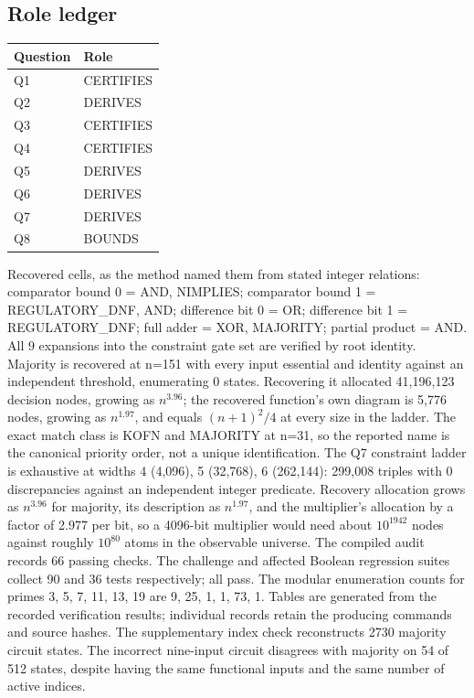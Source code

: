 \subsection*{Role ledger}
\begin{center}\begin{tabular}{ll}\toprule Question & Role\\\midrule
Q1 & CERTIFIES\\
Q2 & DERIVES\\
Q3 & CERTIFIES\\
Q4 & CERTIFIES\\
Q5 & DERIVES\\
Q6 & DERIVES\\
Q7 & DERIVES\\
Q8 & BOUNDS\\
\bottomrule\end{tabular}\end{center}
Recovered cells, as the method named them from stated integer relations: comparator bound 0 = AND, NIMPLIES; comparator bound 1 = REGULATORY\_DNF, AND; difference bit 0 = OR; difference bit 1 = REGULATORY\_DNF; full adder = XOR, MAJORITY; partial product = AND. All 9 expansions into the constraint gate set are verified by root identity.
Majority is recovered at n=151 with every input essential and identity against an independent threshold, enumerating 0 states. Recovering it allocated 41,196,123 decision nodes, growing as $n^{3.96}$; the recovered function's own diagram is 5,776 nodes, growing as $n^{1.97}$, and equals $(n+1)^2/4$ at every size in the ladder. The exact match class is KOFN and MAJORITY at n=31, so the reported name is the canonical priority order, not a unique identification.
The Q7 constraint ladder is exhaustive at widths 4 (4,096), 5 (32,768), 6 (262,144): 299,008 triples with 0 discrepancies against an independent integer predicate.
Recovery allocation grows as $n^{3.96}$ for majority, its description as $n^{1.97}$, and the multiplier's allocation by a factor of 2.977 per bit, so a 4096-bit multiplier would need about $10^{1942}$ nodes against roughly $10^{80}$ atoms in the observable universe.
The compiled audit records 66 passing checks. The challenge and affected Boolean regression suites collect 90 and 36 tests respectively; all pass. The modular enumeration counts for primes 3, 5, 7, 11, 13, 19 are 9, 25, 1, 1, 73, 1.
Tables are generated from the recorded verification results; individual records retain the producing commands and source hashes.
The supplementary index check reconstructs 2730 majority circuit states. The incorrect nine-input circuit disagrees with majority on 54 of 512 states, despite having the same functional inputs and the same number of active indices.
